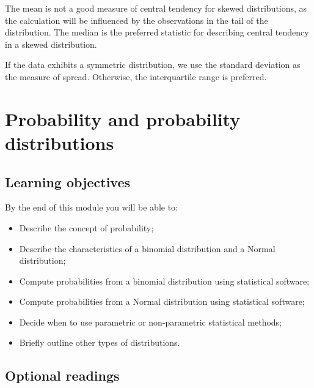 \documentclass[
  a4paper,
]{memoir}
\providecommand{\tightlist}{%
  \setlength{\itemsep}{0pt}\setlength{\parskip}{0pt}}\usepackage{longtable,booktabs,array}
\begin{document}
The mean is not a good measure of central tendency for skewed
distributions, as the calculation will be influenced by the observations
in the tail of the distribution. The median is the preferred statistic
for describing central tendency in a skewed distribution.

If the data exhibits a symmetric distribution, we use the standard
deviation as the measure of spread. Otherwise, the interquartile range
is preferred.


\hypertarget{probability-and-probability-distributions}{%
\chapter{Probability and probability
distributions}\label{probability-and-probability-distributions}}

\hypertarget{learning-objectives-1}{%
\section*{Learning objectives}\label{learning-objectives-1}}


By the end of this module you will be able to:

\begin{itemize}
\tightlist
\item
  Describe the concept of probability;
\item
  Describe the characteristics of a binomial distribution and a Normal
  distribution;
\item
  Compute probabilities from a binomial distribution using statistical
  software;
\item
  Compute probabilities from a Normal distribution using statistical
  software;
\item
  Decide when to use parametric or non-parametric statistical methods;
\item
  Briefly outline other types of distributions.
\end{itemize}

\hypertarget{optional-readings-1}{%
\section*{Optional readings}\label{optional-readings-1}}
\end{document}
